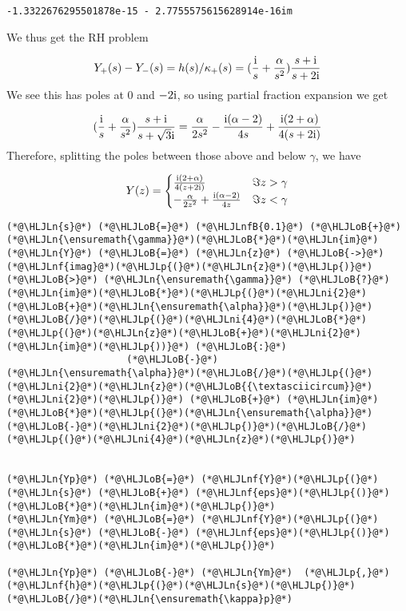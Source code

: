 \documentclass[12pt,a4paper]{article}
\newcommand{\HLJLn}[1]{#1}
\newcommand{\HLJLnf}[1]{\textcolor[RGB]{66,102,213}{#1}}
\newcommand{\HLJLnfB}[1]{\textcolor[RGB]{59,151,46}{#1}}
\newcommand{\HLJLni}[1]{\textcolor[RGB]{59,151,46}{#1}}
\newcommand{\HLJLoB}[1]{\textcolor[RGB]{102,102,102}{\textbf{#1}}}
\newcommand{\HLJLp}[1]{#1}
\def\I{ {\rm i} }
\begin{document}
\begin{lstlisting}
-1.3322676295501878e-15 - 2.7755575615628914e-16im
\end{lstlisting}


We thus get the RH problem

\[
Y_+(s) - Y_-(s) = h(s)/\kappa_+(s) =  ({\I \over s} + {\alpha \over s^2})  {s + \I  \over s + 2 \I}
\]
We see this has poles at $0$ and $-2 \I$, so using partial fraction expansion we get

\[
({\I \over s} + {\alpha \over s^2})  {s + \I  \over s + \sqrt{3} \I} =
{\alpha \over 2 s^2}- {\I (\alpha-2) \over 4 s}  +{\I (2+\alpha) \over 4 (s+2 \I)}
\]
Therefore, splitting the poles between those above and below $\gamma$, we have

\[
Y(z) = \begin{cases}
 {\I (2+\alpha) \over 4 (z+2 \I)} & \Im z > \gamma \\
-{\alpha \over 2 z^2}+{\I (\alpha-2) \over 4 z} & \Im z < \gamma
\end{cases}
\]

\begin{lstlisting}
(*@\HLJLn{s}@*) (*@\HLJLoB{=}@*) (*@\HLJLnfB{0.1}@*) (*@\HLJLoB{+}@*) (*@\HLJLn{\ensuremath{\gamma}}@*)(*@\HLJLoB{*}@*)(*@\HLJLn{im}@*)
(*@\HLJLn{Y}@*) (*@\HLJLoB{=}@*) (*@\HLJLn{z}@*) (*@\HLJLoB{->}@*) (*@\HLJLnf{imag}@*)(*@\HLJLp{(}@*)(*@\HLJLn{z}@*)(*@\HLJLp{)}@*) (*@\HLJLoB{>}@*) (*@\HLJLn{\ensuremath{\gamma}}@*) (*@\HLJLoB{?}@*) (*@\HLJLn{im}@*)(*@\HLJLoB{*}@*)(*@\HLJLp{(}@*)(*@\HLJLni{2}@*)(*@\HLJLoB{+}@*)(*@\HLJLn{\ensuremath{\alpha}}@*)(*@\HLJLp{)}@*)(*@\HLJLoB{/}@*)(*@\HLJLp{(}@*)(*@\HLJLni{4}@*)(*@\HLJLoB{*}@*)(*@\HLJLp{(}@*)(*@\HLJLn{z}@*)(*@\HLJLoB{+}@*)(*@\HLJLni{2}@*)(*@\HLJLn{im}@*)(*@\HLJLp{))}@*) (*@\HLJLoB{:}@*)
                     (*@\HLJLoB{-}@*) (*@\HLJLn{\ensuremath{\alpha}}@*)(*@\HLJLoB{/}@*)(*@\HLJLp{(}@*)(*@\HLJLni{2}@*)(*@\HLJLn{z}@*)(*@\HLJLoB{{\textasciicircum}}@*)(*@\HLJLni{2}@*)(*@\HLJLp{)}@*) (*@\HLJLoB{+}@*) (*@\HLJLn{im}@*)(*@\HLJLoB{*}@*)(*@\HLJLp{(}@*)(*@\HLJLn{\ensuremath{\alpha}}@*)(*@\HLJLoB{-}@*)(*@\HLJLni{2}@*)(*@\HLJLp{)}@*)(*@\HLJLoB{/}@*)(*@\HLJLp{(}@*)(*@\HLJLni{4}@*)(*@\HLJLn{z}@*)(*@\HLJLp{)}@*)


(*@\HLJLn{Yp}@*) (*@\HLJLoB{=}@*) (*@\HLJLnf{Y}@*)(*@\HLJLp{(}@*)(*@\HLJLn{s}@*) (*@\HLJLoB{+}@*) (*@\HLJLnf{eps}@*)(*@\HLJLp{()}@*)(*@\HLJLoB{*}@*)(*@\HLJLn{im}@*)(*@\HLJLp{)}@*)
(*@\HLJLn{Ym}@*) (*@\HLJLoB{=}@*) (*@\HLJLnf{Y}@*)(*@\HLJLp{(}@*)(*@\HLJLn{s}@*) (*@\HLJLoB{-}@*) (*@\HLJLnf{eps}@*)(*@\HLJLp{()}@*)(*@\HLJLoB{*}@*)(*@\HLJLn{im}@*)(*@\HLJLp{)}@*)

(*@\HLJLn{Yp}@*) (*@\HLJLoB{-}@*) (*@\HLJLn{Ym}@*)  (*@\HLJLp{,}@*) (*@\HLJLnf{h}@*)(*@\HLJLp{(}@*)(*@\HLJLn{s}@*)(*@\HLJLp{)}@*)(*@\HLJLoB{/}@*)(*@\HLJLn{\ensuremath{\kappa}p}@*)
\end{lstlisting}
\end{document}
